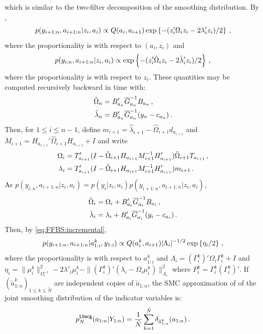 which is similar to the two-filter decomposition of the smoothing distribution. By  \cite{lindsten:bunch:sarkka:schon:godsill:2015},
\[
p(y_{i+1:n},a_{i+1:n}|z_i,a_{i}) \propto Q(a_i,a_{i+1}) \exp\left\{-(z_i'\Omega_iz_i-2\lambda_i'z_i)/2\right\}\,,
\]
where the proportionality is with respect to $(a_i,z_i)$ and
\[
p(y_{i:n},a_{i+1:n}|z_i,a_{i}) \propto \exp\left\{-(z_i'\hat{\Omega}_iz_i-2\hat{\lambda}_i'z_i)/2\right\}\,,
\]
where the proportionality is with respect to $z_i$. These quantities may be computed recursively backward in time with:
\begin{align*}
\hat{\Omega}_n &= B'_{a_n}\overline{G}^{-1}_{a_n}B_{a_n}\,,\\
\hat{\lambda}_n &=B'_{a_n}\overline{G}^{-1}_{a_n}(y_n-c_{a_n})\,.
\end{align*}
Then, for $1\le i\le n-1$, define $m_{i+1} = \hat{\lambda}_{i+1} - \hat{\Omega}_{i+1}d_{a_{i+1}}$ and $M_{i+1} = H_{a_{i+1}}'\hat{\Omega}_{i+1}H_{a_{i+1}} + I$ and write
\begin{align*}
\Omega_i &= T'_{a_{i+1}}(I-\hat{\Omega}_{i+1}H_{a_{i+1}}M^{-1}_{i+1}H'_{a_{i+1}})\hat{\Omega}_{i+1}T_{a_{i+1}}\,,\\
\lambda_i &=T'_{a_{i+1}}(I-\hat{\Omega}_{i+1}H_{a_{i+1}}M^{-1}_{i+1}H'_{a_{i+1}})m_{i+1}\,.
\end{align*}
As $p(y_{i:n},a_{i+1:n}|z_i,a_{i}) = p(y_{i}|z_i,a_{i})p(y_{i+1:n},a_{i+1:n}|z_i,a_{i})$,
\begin{align*}
\hat{\Omega}_i &= \Omega_i + B'_{a_i}\overline{G}^{-1}_{a_i}B_{a_i}\,,\\
\hat{\lambda}_i & = \lambda_i + B'_{a_i}\overline{G}^{-1}_{a_i}(y_i-c_{a_i})\,.
\end{align*}
Then, by \eqref{eq:FFBS:incremental},
\begin{equation}
\label{eq:post:obs}
p(y_{i+1:n},a_{i+1:n}|a^k_{1:i},y_{1:i})\propto Q(a_i^k,a_{i+1})|\Lambda_i|^{-1/2}\exp\left\{\eta_i/2\right\}\,,
\end{equation}
where the proportionality is with respect to $a^k_{1:i}$ and $\Lambda_i = (\Gamma_i^k)'\Omega_i\Gamma_i^k + I$ and $\eta_i = \|\mu_i^k\|^2_{\Omega^{-1}_i} - 2\lambda'_i\mu_i^k-\|(\Gamma_i^k)'(\lambda_i-\Omega_i\mu_i^k)\|^2_{\Lambda_i}$ where $P_i^k = \Gamma_i^k(\Gamma_i^k)'$.
If $(\tilde{a}^k_{1:n})_{1\le k \le \tilde{N}}$ are independent copies of $\tilde{a}_{1:n}$, the SMC approximation of \cite{lindsten:bunch:sarkka:schon:godsill:2015} of the joint smoothing distribution of the indicator variables is:
\[
p^{\mathsf{Lbscg}}_N(a_{1:n}|Y_{1:n}) = \frac{1}{\tilde{N}}\sum_{k=1}^{\tilde N} \delta_{\tilde{a}^{k}_{1:n}}(a_{1:n})\,.
\]
